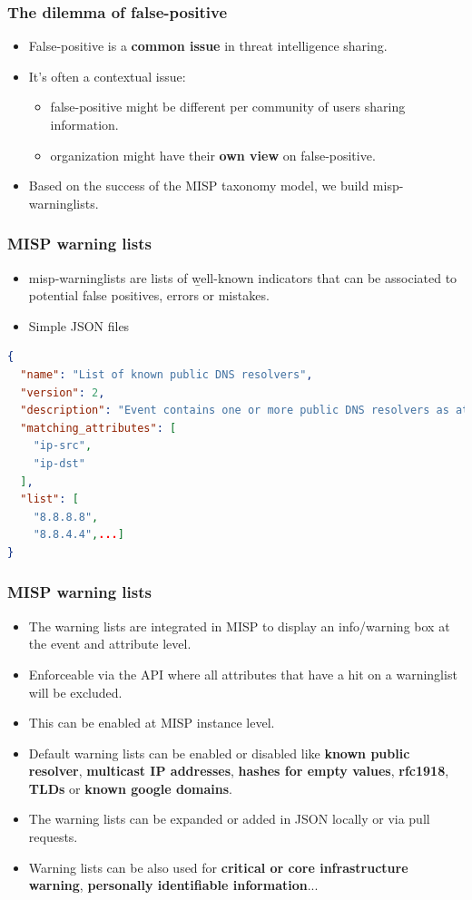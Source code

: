 \begin{frame}
        \frametitle{The dilemma of false-positive}
        \begin{itemize}
            \item False-positive is a {\bf common issue} in threat intelligence sharing.
                \item It's often a contextual issue:
                \begin{itemize}
                \item false-positive might be different per community of users sharing information.
                \item organization might have their {\bf own view} on false-positive.
                \end{itemize}
        \item Based on the success of the MISP taxonomy model, we build misp-warninglists.
        \end{itemize}
\end{frame}

\begin{frame}[t,fragile]
        \frametitle{MISP warning lists}
        \begin{itemize}
            \item misp-warninglists are lists of {\b well-known indicators} that can be associated to potential false positives, errors or mistakes.
                \item Simple JSON files
        \end{itemize}
\begin{lstlisting}[language=json,firstnumber=1]
{
  "name": "List of known public DNS resolvers",
  "version": 2,
  "description": "Event contains one or more public DNS resolvers as attribute with an IDS flag set",
  "matching_attributes": [
    "ip-src",
    "ip-dst"
  ],
  "list": [
    "8.8.8.8",
    "8.8.4.4",...]
}
\end{lstlisting}
\end{frame}

\begin{frame}[t,fragile]
\frametitle{MISP warning lists}
\begin{itemize}
\item The warning lists are integrated in MISP to display an info/warning box at the event and attribute level.
\item Enforceable via the API where all attributes that have a hit on a warninglist will be excluded.
\item This can be enabled at MISP instance level.
\item Default warning lists can be enabled or disabled like {\bf known public resolver}, {\bf multicast IP addresses}, {\bf hashes for empty values}, {\bf rfc1918}, {\bf TLDs} or {\bf known google domains}.
\item The warning lists can be expanded or added in JSON locally or via pull requests.
\item Warning lists can be also used for {\bf critical or core infrastructure warning}, {\bf personally identifiable information}...
\end{itemize}
\end{frame}


